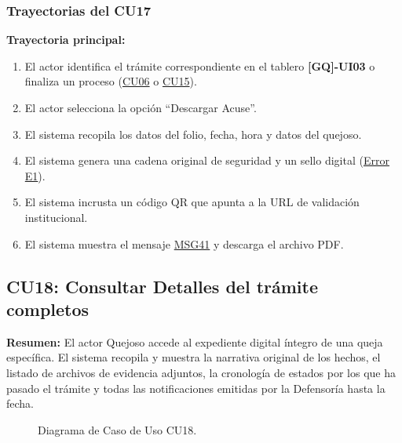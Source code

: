 \begin{appendices}
\subsubsection{Trayectorias del CU17}
\textbf{Trayectoria principal:}
\begin{enumerate}[nosep]
    \item El actor identifica el trámite correspondiente en el tablero \textbf{[GQ]-UI03} o finaliza un proceso (\hyperlink{anexo:casos_uso}{CU06} o \hyperlink{anexo:casos_uso}{CU15}).
    \item El actor selecciona la opción ``Descargar Acuse''.
    \item El sistema recopila los datos del folio, fecha, hora y datos del quejoso.
    \item El sistema genera una cadena original de seguridad y un sello digital (\hyperlink{err:E22}{Error E1}).
    \item El sistema incrusta un código QR que apunta a la URL de validación institucional.
    \item El sistema muestra el mensaje \hyperlink{msg:MSG41}{MSG41} y descarga el archivo PDF.
\end{enumerate}

\newpage

\subsection{CU18: Consultar Detalles del trámite completos}

\textbf{Resumen:} 
El actor Quejoso accede al expediente digital íntegro de una queja específica. El sistema recopila y muestra la narrativa original de los hechos, el listado de archivos de evidencia adjuntos, la cronología de estados por los que ha pasado el trámite y todas las notificaciones emitidas por la Defensoría hasta la fecha.

\begin{figure}[htbp]
    \centering
    \figCUdieciocho
    \caption{Diagrama de Caso de Uso CU18.}
    \label{fig:cu18}
\end{figure}


\end{appendices}
